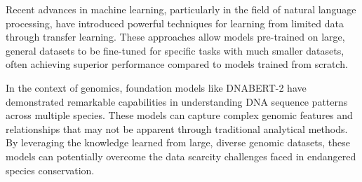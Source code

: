 Recent advances in machine learning, particularly in the field of natural language processing, have introduced powerful techniques for learning from limited data through transfer learning. These approaches allow models pre-trained on large, general datasets to be fine-tuned for specific tasks with much smaller datasets, often achieving superior performance compared to models trained from scratch.

In the context of genomics, foundation models like DNABERT-2 \cite{zhou2024dnabert} have demonstrated remarkable capabilities in understanding DNA sequence patterns across multiple species. These models can capture complex genomic features and relationships that may not be apparent through traditional analytical methods. By leveraging the knowledge learned from large, diverse genomic datasets, these models can potentially overcome the data scarcity challenges faced in endangered species conservation.
